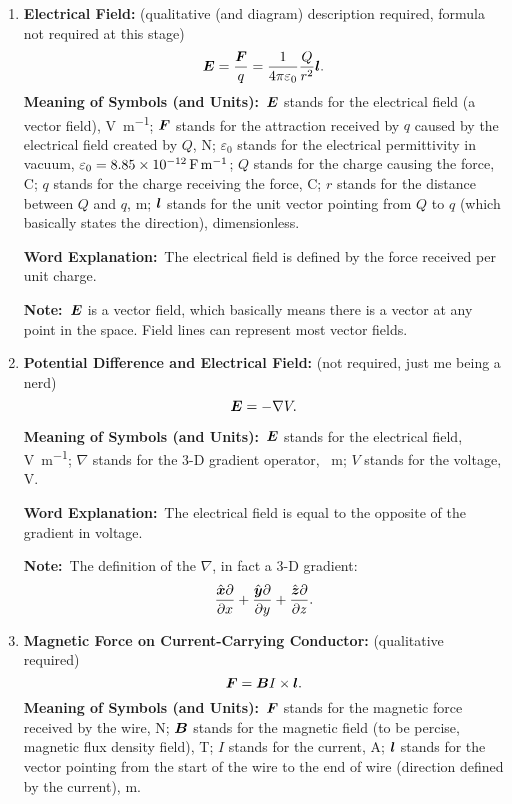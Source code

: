 \documentclass[8pt]{article}
\newcommand{\MeanSymb}{\textbf{Meaning of Symbols (and Units):}\ }
\newcommand{\WordExpl}{\textbf{Word Explanation:}\ }
\newcommand{\Note}{\textbf{Note:}\ }
\begin{document}
\begin{enumerate}
                \item \textbf{Electrical Field:} (qualitative (and diagram) description required, formula not required at this stage)
                \[
                    \boldsymbol{E} = \frac{\boldsymbol{F}}{q} = \frac{1}{4 \pi \varepsilon_0} \frac{Q}{r^2} \boldsymbol{l}.
                \]
                \MeanSymb \(\boldsymbol{E}\) stands for the electrical field (a vector field), \unit{\volt\per\metre}; \(\boldsymbol{F}\) stands for the attraction received by \(q\) caused by the electrical field created by \(Q\), \unit{\newton}; \(\varepsilon_0\) stands for the electrical permittivity in vacuum, \(\varepsilon_0 = \qty{8.85 e -12}{\farad \per \metre}\); \(Q\) stands for the charge causing the force, \unit{\coulomb}; \(q\) stands for the charge receiving the force, \unit{\coulomb}; \(r\) stands for the distance between \(Q\) and \(q\), \unit{\metre}; \(\boldsymbol{l}\) stands for the unit vector pointing from \(Q\) to \(q\) (which basically states the direction), dimensionless.

                \WordExpl The electrical field is defined by the force received per unit charge.

                \Note \(\boldsymbol{E}\) is a vector field, which basically means there is a vector at any point in the space. Field lines can represent most vector fields.

                \item \textbf{Potential Difference and Electrical Field:} (not required, just me being a nerd)
                \[
                    \boldsymbol{E} = - \nabla V.
                \]

                \MeanSymb \(\boldsymbol{E}\) stands for the electrical field, \unit{\volt \per \metre}; \(\nabla\) stands for the 3-D gradient operator, \unit{\per \metre}; \(V\) stands for the voltage, \unit{\volt}.

                \WordExpl The electrical field is equal to the opposite of the gradient in voltage.

                \Note The definition of the \(\nabla\), in fact a 3-D gradient:
                \[
                    \frac{\hat{\boldsymbol{x}} \partial}{\partial x} + \frac{\hat{\boldsymbol{y}} \partial}{\partial y} + \frac{\hat{\boldsymbol{z}} \partial}{\partial z}.
                \]
                \item \textbf{Magnetic Force on Current-Carrying Conductor:} (qualitative required)
                \[
                    \boldsymbol{F} = \boldsymbol{B} I \times \boldsymbol{l}.
                \]
                \MeanSymb \(\boldsymbol{F}\) stands for the magnetic force received by the wire, \unit{\newton}; \(\boldsymbol{B}\) stands for the magnetic field (to be percise, magnetic flux density field), \unit{\tesla}; \(I\) stands for the current, \unit{\ampere}; \(\boldsymbol{l}\) stands for the vector pointing from the start of the wire to the end of wire (direction defined by the current), \unit{\metre}.


\end{enumerate}
\end{document}
